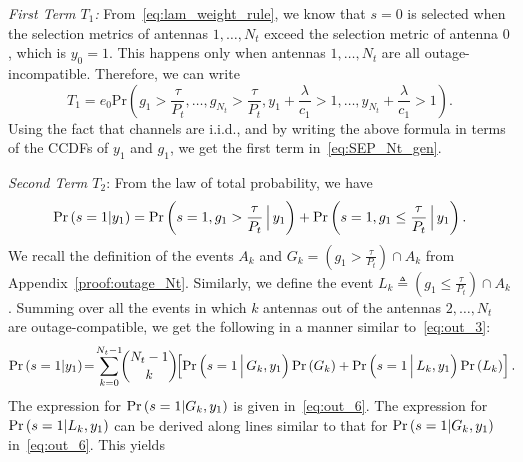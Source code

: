 \documentclass[12pt,draftcls,peerreview,onecolumn]{IEEEtran}
\newcommand{\brac}[1]{\left({#1}\right)}
\newcommand{\define}{\triangleq}
\newcommand{\prob}[1]{\text{Pr}\brac{#1}}
\newcommand{\given}{\arrowvert}
\newcommand{\Given}{\Big\arrowvert}
\newcommand{\nck}[2]{\binom{#1}{#2}}
\newcommand{\setA}{A}
\newcommand{\setAk}{\setA_{k}}
\newcommand{\setG}{G}
\newcommand{\setL}{L}
\newcommand{\setGk}{\setG_k}
\newcommand{\setLk}{\setL_k}
\newcommand{\lam}{\lambda}
\newcommand{\termone}{T_1}
\newcommand{\termtwo}{T_2}
\newcommand{\Nt}{{N_t}}
\newcommand{\Pt}{{P_t}}
\newcommand{\puch}{g}
\newcommand{\gk}[1]{{\puch_{#1}}}
\newcommand{\itau}{\tau}
\newcommand{\cone}{c_{1}}
\newcommand{\taubypt}{\frac{\itau}{\Pt}}
\newcommand{\gkgrtaubypt}[1]{{\gk{#1}}>\taubypt}
\newcommand{\gklttaubypt}[1]{{\gk{#1}}\leq\taubypt}
\newcommand{\lambym}{\frac{\lam}{\cone}}
\newcommand{\yk}[1]{y_{#1}}
\newcommand{\zerosep}{e_0}
\begin{document}
{\em First Term $\termone$:}
From~\eqref{eq:lam_weight_rule}, we know that ${s=0}$ is selected when the selection metrics of antennas $1,\ldots,\Nt$ exceed the selection metric of antenna $0$, which is $\yk{0}=1$. This happens only when antennas $1,\ldots,\Nt$ are all outage-incompatible. Therefore, we can write%
\begin{equation}
\termone = \zerosep\prob{\gkgrtaubypt{1},\dots,\gkgrtaubypt{\Nt}, \yk{1}\!+\!\lambym >1,\ldots,\yk{\Nt}\!+\!\lambym >1}.
\label{eq:termone_a}
\end{equation}
%
Using the fact that channels are i.i.d., and by writing the above formula in terms of the CCDFs of $\yk{1}$ and $\gk{1}$, we get the first term in~\eqref{eq:SEP_Nt_gen}.


{\em Second Term $\termtwo$}: From the law of total probability, we have 
%
\begin{equation}
\prob{s = 1\given \yk{1}} = \prob{s = 1,\gk{1}>\taubypt\Given\yk{1}}  + \prob{s = 1,\gk{1}\leq\taubypt\Given \yk{1}}. 
\label{eq:pr_s_1}
\end{equation}
%
We recall  the definition of the events $\setAk$ and   $\setGk=\left(\gkgrtaubypt{1}\right)\cap\setAk$ from Appendix~\ref{proof:outage_Nt}. Similarly, we define the event $\setLk\define\left(\gklttaubypt{1}\right)\cap\setAk $. Summing over all the events in which $k$ antennas out of the antennas $2,\ldots,\Nt$ are outage-compatible, we get the following in a manner similar to~\eqref{eq:out_3}:
\begin{equation}
\prob{s = 1\given \yk{1}} \! =\! \sum_{k=0}^{\Nt-1}\!\!\nck{\Nt-1}{k}\!\! 
\left[ \prob{s = 1 \Given \setGk , \yk{1}} \prob{\setGk} +  \prob{s = 1 \Given \setLk, \yk{1}} \prob{\setLk}\right].\!\! 
\label{eq:pr_s_1_2}
\end{equation}
% 
%
The expression for $\prob{s = 1\given \setGk, \yk{1}}$ is given in~\eqref{eq:out_6}.  The expression for $\prob{s = 1\given \setLk, \yk{1}}$ can be derived along lines similar to that for $\prob{s = 1\given \setGk, \yk{1}}$ in~\eqref{eq:out_6}. This yields   
\end{document}
